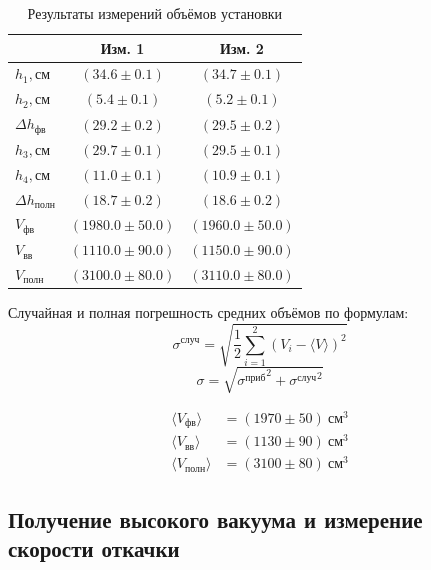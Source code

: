 \documentclass[a4paper, 12pt]{article}
\begin{document}
        \begin{table}[!ht]
            \centering
            \begin{tabular}{|l|c|c|}
                \hline

                 & Изм. 1 & Изм. 2\\ \hline
                $h_1, см$ & $(34.6 \pm 0.1)$ & $(34.7 \pm 0.1)$\\ \hline
                $h_2, см$ & $(5.4 \pm 0.1)$ & $(5.2 \pm 0.1)$\\ \hline
                $\Delta h_{фв}$ & $(29.2 \pm 0.2)$ & $(29.5 \pm 0.2)$\\ \hline
                $h_3, см$ & $(29.7 \pm 0.1)$ & $(29.5 \pm 0.1)$\\ \hline
                $h_4, см$ & $(11.0 \pm 0.1)$ & $(10.9 \pm 0.1)$\\ \hline
                $\Delta h_{полн}$ & $(18.7 \pm 0.2)$ & $(18.6 \pm 0.2)$\\ \hline
                $V_{фв}$ & $(1980.0 \pm 50.0)$ & $(1960.0 \pm 50.0)$\\ \hline
                $V_{вв}$ & $(1110.0 \pm 90.0)$ & $(1150.0 \pm 90.0)$\\ \hline
                $V_{полн}$ & $(3100.0 \pm 80.0)$ & $(3110.0 \pm 80.0)$\\ \hline

            \end{tabular}
            \caption{Результаты измерений объёмов установки}
            \label{volumes}
        \end{table}

        Случайная и полная погрешность средних объёмов по формулам:
        $$ \sigma^{случ} = \sqrt{ \frac{1}{2} \sum_{i=1}^{2} (V_i - \langle V \rangle )^2 } $$
        $$ \sigma = \sqrt{{\sigma^{приб}}^2 + {\sigma^{случ}}^2} $$

        \begin{align*}
            \langle V_{фв} \rangle &= (1970 \pm 50)~см^3\\
            \langle V_{вв} \rangle &= (1130 \pm 90)~см^3\\
            \langle V_{полн} \rangle &= (3100 \pm 80)~см^3
        \end{align*}

    \subsection{Получение высокого вакуума и измерение скорости откачки}
\end{document}
